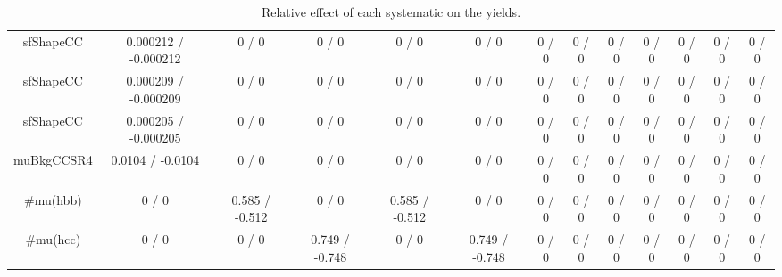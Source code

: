 \documentclass[10pt]{article}
\begin{document}
\begin{table}[htbp]
\begin{center}
\begin{tabular}{|c|c|c|c|c|c|c|c|c|c|c|c|c|}
  sfShapeCC & 0.000212 / -0.000212 & 0 / 0 & 0 / 0 & 0 / 0 & 0 / 0 & 0 / 0 & 0 / 0 & 0 / 0 & 0 / 0 & 0 / 0 & 0 / 0 & 0 / 0 \\ 
  sfShapeCC & 0.000209 / -0.000209 & 0 / 0 & 0 / 0 & 0 / 0 & 0 / 0 & 0 / 0 & 0 / 0 & 0 / 0 & 0 / 0 & 0 / 0 & 0 / 0 & 0 / 0 \\ 
  sfShapeCC & 0.000205 / -0.000205 & 0 / 0 & 0 / 0 & 0 / 0 & 0 / 0 & 0 / 0 & 0 / 0 & 0 / 0 & 0 / 0 & 0 / 0 & 0 / 0 & 0 / 0 \\ 
  muBkgCCSR4 & 0.0104 / -0.0104 & 0 / 0 & 0 / 0 & 0 / 0 & 0 / 0 & 0 / 0 & 0 / 0 & 0 / 0 & 0 / 0 & 0 / 0 & 0 / 0 & 0 / 0 \\ 
  #mu(hbb) & 0 / 0 & 0.585 / -0.512 & 0 / 0 & 0.585 / -0.512 & 0 / 0 & 0 / 0 & 0 / 0 & 0 / 0 & 0 / 0 & 0 / 0 & 0 / 0 & 0 / 0 \\ 
  #mu(hcc) & 0 / 0 & 0 / 0 & 0.749 / -0.748 & 0 / 0 & 0.749 / -0.748 & 0 / 0 & 0 / 0 & 0 / 0 & 0 / 0 & 0 / 0 & 0 / 0 & 0 / 0 \\ 
\hline 
\end{tabular} 
\caption{Relative effect of each systematic on the yields.} 
\end{center} 
\end{table} 
\end{document}

